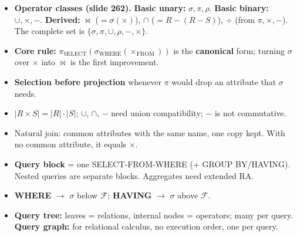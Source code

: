 \documentclass[10pt,a4paper]{article}
\newcommand{\agg}{\mathcal{F}}            %
\begin{document}
\begin{itemize}
  \item \textbf{Operator classes (slide 262).} \textbf{Basic unary:} $\sigma, \pi, \rho$. \textbf{Basic binary:} $\cup, \times, -$. \textbf{Derived:} $\bowtie$ ($=\sigma(\times)$), $\cap$ ($=R-(R-S)$), $\div$ (from $\pi, \times, -$). The complete set is $\{\sigma, \pi, \cup, \rho, -, \times\}$.
  \item \textbf{Core rule:} $\pi_{\text{SELECT}}(\sigma_{\text{WHERE}}(\times_{\text{FROM}}))$ is the \textbf{canonical} form; turning $\sigma$ over $\times$ into $\bowtie$ is the first improvement.
  \item \textbf{Selection before projection} whenever $\pi$ would drop an attribute that $\sigma$ needs.
  \item $|R \times S| = |R|\cdot|S|$; $\cup$, $\cap$, $-$ need union compatibility; $-$ is not commutative.
  \item Natural join: common attributes with the same name, one copy kept. With no common attribute, it equals $\times$.
  \item \textbf{Query block} = one SELECT-FROM-WHERE (+ GROUP BY/HAVING). Nested queries are separate blocks. Aggregates need extended RA.
  \item \textbf{WHERE} $\to$ $\sigma$ below $\agg$; \textbf{HAVING} $\to$ $\sigma$ above $\agg$.
  \item \textbf{Query tree:} leaves = relations, internal nodes = operators; many per query. \textbf{Query graph:} for relational calculus, no execution order, one per query.
\end{itemize}
\end{document}
